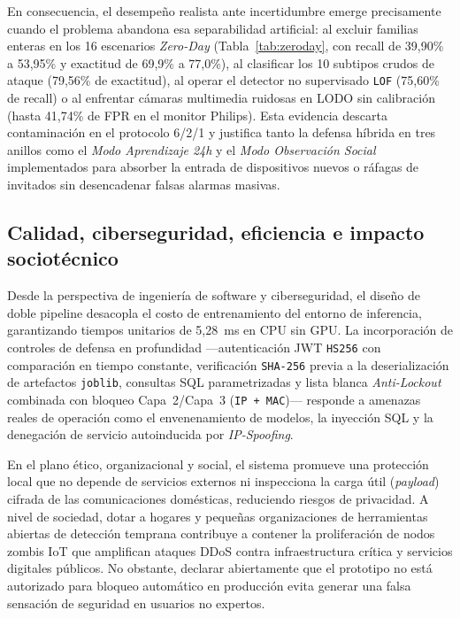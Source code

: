 \documentclass[11pt,a4paper]{article}
\begin{document}
En consecuencia, el desempeño realista ante incertidumbre emerge precisamente cuando el problema abandona esa separabilidad artificial: al excluir familias enteras en los 16 escenarios \textit{Zero-Day} (Tabla~\ref{tab:zeroday}, con recall de 39,90\% a 53,95\% y exactitud de 69,9\% a 77,0\%), al clasificar los 10 subtipos crudos de ataque (79,56\% de exactitud), al operar el detector no supervisado \texttt{LOF} (75,60\% de recall) o al enfrentar cámaras multimedia ruidosas en LODO sin calibración (hasta 41,74\% de FPR en el monitor Philips). Esta evidencia descarta contaminación en el protocolo 6/2/1 y justifica tanto la defensa híbrida en tres anillos como el \textit{Modo Aprendizaje 24h} y el \textit{Modo Observación Social} implementados para absorber la entrada de dispositivos nuevos o ráfagas de invitados sin desencadenar falsas alarmas masivas.

\subsection{Calidad, ciberseguridad, eficiencia e impacto sociotécnico}
Desde la perspectiva de ingeniería de software y ciberseguridad, el diseño de doble pipeline desacopla el costo de entrenamiento del entorno de inferencia, garantizando tiempos unitarios de 5,28~ms en CPU sin GPU. La incorporación de controles de defensa en profundidad ---autenticación JWT \texttt{HS256} con comparación en tiempo constante, verificación \texttt{SHA-256} previa a la deserialización de artefactos \texttt{joblib}, consultas SQL parametrizadas y lista blanca \textit{Anti-Lockout} combinada con bloqueo Capa~2/Capa~3 (\texttt{IP + MAC})--- responde a amenazas reales de operación como el envenenamiento de modelos, la inyección SQL y la denegación de servicio autoinducida por \textit{IP-Spoofing}.

En el plano ético, organizacional y social, el sistema promueve una protección local que no depende de servicios externos ni inspecciona la carga útil (\textit{payload}) cifrada de las comunicaciones domésticas, reduciendo riesgos de privacidad. A nivel de sociedad, dotar a hogares y pequeñas organizaciones de herramientas abiertas de detección temprana contribuye a contener la proliferación de nodos zombis IoT que amplifican ataques DDoS contra infraestructura crítica y servicios digitales públicos. No obstante, declarar abiertamente que el prototipo no está autorizado para bloqueo automático en producción evita generar una falsa sensación de seguridad en usuarios no expertos.
\end{document}

